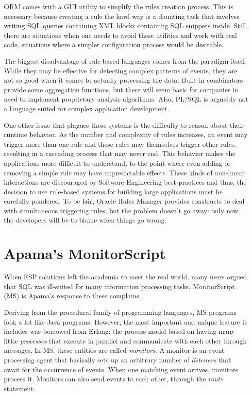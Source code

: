 \documentclass{report}
\begin{document}
ORM comes with a GUI utility to simplify the rules creation
process. This is necessary because creating a rule the hard way is a
daunting task that involves writing SQL queries containing XML blocks
containing SQL snippets inside. Still, there are situations when one
needs to avoid these utilities and work with real code, situations
where a simpler configuration process would be desirable.

The biggest disadvantage of rule-based languages comes from the
paradigm itself. While they may be effective for detecting complex
patterns of events, they are not so good when it comes to actually
processing the data. Built-in combinators provide some aggregation
functions, but these will seem basic for companies in need to
implement proprietary analysis algorithms. Also, PL/SQL is arguably
not a language suited for complex application development.

One other issue that plagues these systems is the difficulty to reason
about their runtime behavior. As the number and complexity of rules
increases, an event may trigger more than one rule and these rules may
themselves trigger other rules, resulting in a cascading process that
may never end. This behavior makes the applications more difficult to
understand, to the point where even adding or removing a simple rule
may have unpredictable effects. These kinds of non-linear interactions
are discouraged by Software Engineering best-practices and thus, the
decision to use rule-based systems for building large applications
must be carefully pondered. To be fair, Oracle Rules Manager provides
constructs to deal with simultaneous triggering rules, but the problem
doesn't go away: only now the developers will be to blame when things
go wrong.

\section{Apama's MonitorScript}

When ESP solutions left the academia to meet the real world, many
users argued that SQL was ill-suited for many information processing
tasks. MonitorScript (MS) is Apama's response to these complains.

Deriving from the procedural family of programming languages, MS
programs look a lot like Java programs. However, the most important
and unique feature it includes was borrowed from Erlang: the process
model based on having many little \emph{processes} that execute in
parallel and communicate with each other through messages. In MS,
these entities are called \emph{monitors}. A monitor is an event
processing agent that basically sets up an arbitrary number of
\emph{listeners} that await for the occurrence of events. When one
matching event arrives, monitors process it. Monitors can also send
events to each other, through the \emph{route} statement.
\end{document}
